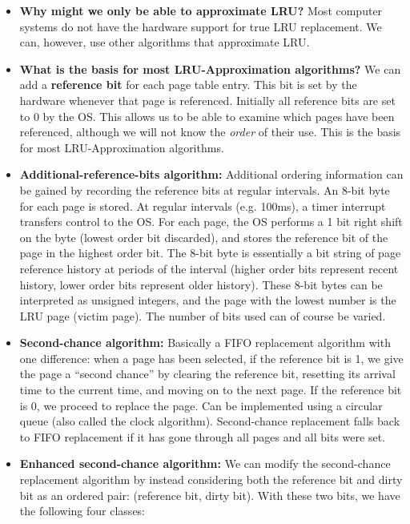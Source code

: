 \documentclass[12pt]{article}
\begin{document}
\begin{itemize}
    \item \textbf{Why might we only be able to approximate LRU?} Most computer systems do not have the hardware support for true LRU replacement. We can, however, use other algorithms that approximate LRU.
    \item \textbf{What is the basis for most LRU-Approximation algorithms?} We can add a \textbf{reference bit} for each page table entry. This bit is set by the hardware whenever that page is referenced. Initially all reference bits are set to 0 by the OS. This allows us to be able to examine which pages have been referenced, although we will not know the \textit{order} of their use. This is the basis for most LRU-Approximation algorithms.
    \item \textbf{Additional-reference-bits algorithm:} Additional ordering information can be gained by recording the reference bits at regular intervals. An 8-bit byte for each page is stored. At regular intervals (e.g. 100ms), a timer interrupt transfers control to the OS. For each page, the OS performs a 1 bit right shift on the byte (lowest order bit discarded), and stores the reference bit of the page in the highest order bit. The 8-bit byte is essentially a bit string of page reference history at periods of the interval (higher order bits represent recent history, lower order bits represent older history). These 8-bit bytes can be interpreted as unsigned integers, and the page with the lowest number is the LRU page (victim page). The number of bits used can of course be varied.
    \item \textbf{Second-chance algorithm:} Basically a FIFO replacement algorithm with one difference: when a page has been selected, if the reference bit is 1, we give the page a ``second chance'' by clearing the reference bit, resetting its arrival time to the current time, and moving on to the next page. If the reference bit is 0, we proceed to replace the page. Can be implemented using a circular queue (also called the clock algorithm). Second-chance replacement falls back to FIFO replacement if it has gone through all pages and all bits were set.
    \item \textbf{Enhanced second-chance algorithm:} We can modify the second-chance replacement algorithm by instead considering both the reference bit and dirty bit as an ordered pair: (reference bit, dirty bit). With these two bits, we have the following four classes:
        \begin{enumerate}

\end{enumerate}
\end{itemize}
\end{document}
